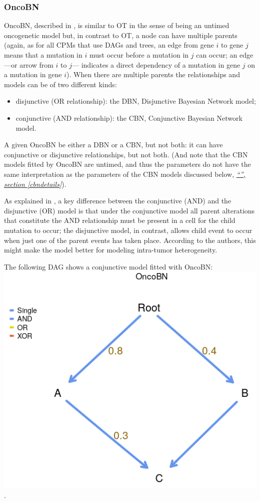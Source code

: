 \documentclass[a4paper,11pt]{article}
\newcommand*{\qrefP}[1]{\hyperref[{#1}]{\textit{``\nameref*{#1}'', section \ref*{#1}}}}
\begin{document}




\subsubsection{OncoBN}\label{oncobndetails}

OncoBN, described in \cite{nicol2021oncogenetic}, is similar to OT in the sense of being an untimed oncogenetic model but, in contrast to OT, a node can have multiple parents (again, as for all CPMs that use DAGs and trees, an edge from gene $i$ to gene $j$ means that a mutation in $i$ must occur before a mutation in $j$ can occur; an edge ---or arrow from $i$ to $j$--- indicates a direct dependency of a mutation in gene $j$ on a mutation in gene $i$). When there are multiple parents the relationships and models can be of two different kinds:
\begin{itemize}
\item disjunctive (OR relationship): the DBN, Disjunctive Bayesian Network model;
\item conjunctive (AND relationship): the CBN, Conjunctive Bayesian Network model.
\end{itemize}

A given OncoBN be either a DBN or a CBN, but not both: it can have conjunctive or disjunctive relationships, but not both. (And note that the CBN models fitted by OncoBN are untimed, and thus the parameters do not have the same interpretation as the parameters of the CBN models discussed below, \qrefP{cbndetails}).

As explained in \citet[p.~2]{nicol2021oncogenetic}, a key difference between the conjunctive (AND) and the disjunctive (OR) model is that under the conjunctive model all parent alterations that constitute the AND relationship must be present in a cell for the child mutation to occur; the disjunctive model, in contrast, allows child event to occur when just one of the parent events has taken place. According to the authors, this might make the model better for modeling intra-tumor heterogeneity.


The following DAG shows a conjunctive model fitted with OncoBN: \\

\includegraphics[width=.45\linewidth]{./oncobn_c1.png}.\\
\end{document}
